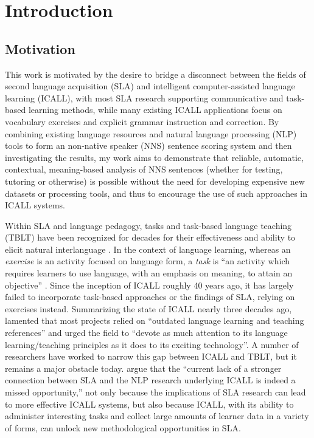 \chapter{Introduction}
\label{chap:intro}

\section{Motivation}
\label{sec:motivation}


This work is motivated by the desire to bridge a disconnect between the fields of second language acquisition (SLA) and intelligent computer-assisted language learning (ICALL), with most SLA research supporting communicative and task-based learning methods, while many existing ICALL applications focus on vocabulary exercises and explicit grammar instruction and correction. By combining existing language resources and natural language processing (NLP) tools to form an non-native speaker (NNS) sentence scoring system and then investigating the results, my work aims to demonstrate that reliable, automatic, contextual, meaning-based analysis of NNS sentences (whether for testing, tutoring or otherwise) is possible without the need for developing expensive new datasets or processing tools, and thus to encourage the use of such approaches in ICALL systems. 

Within SLA and language pedagogy, tasks and task-based language teaching (TBLT) have been recognized for decades for their effectiveness and ability to elicit natural interlanguage \cite{ellis2003task}. In the context of language learning, whereas an \textit{exercise} is an activity focused on language form, a \textit{task} is ``an activity which requires learners to use language, with an emphasis on meaning, to attain an objective'' \cite{bygate2001researching}. Since the inception of ICALL roughly 40 years ago, it has largely failed to incorporate task-based approaches or the findings of SLA, relying on exercises instead. Summarizing the state of ICALL nearly three decades ago, \citet{oxford1993intelligent} lamented that most projects relied on ``outdated language learning and teaching references'' and urged the field to ``devote as much attention to its language learning/teaching principles as it does to its exciting technology''. A number of researchers have worked to narrow this gap between ICALL and TBLT, but it remains a major obstacle today. \citet{ziegler2017interdisciplinary} argue that the ``current lack of a stronger connection between SLA and the NLP research underlying ICALL is indeed a missed opportunity,'' not only because the implications of SLA research can lead to more effective ICALL systems, but also because ICALL, with its ability to administer interesting tasks and collect large amounts of learner data in a variety of forms, can unlock new methodological opportunities in SLA.


